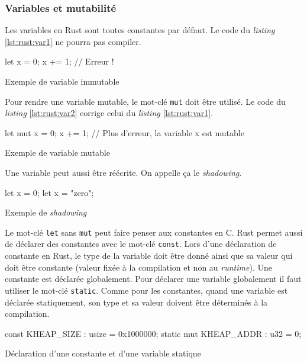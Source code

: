 \subsubsection{Variables et mutabilité}
Les variables en Rust sont toutes constantes par défaut. Le code du \textit{listing}
\ref{lst:rust:var1} ne pourra pas compiler.

\begin{code}
\begin{rustcode}
let x = 0;
x += 1; // Erreur !
\end{rustcode}
\caption{Exemple de variable immutable}
\label{lst:rust:var1}
\end{code} \bigbreak

Pour rendre une variable mutable, le mot-clé \texttt{mut} doit être utilisé.
Le code du \textit{listing} \ref{lst:rust:var2} corrige celui du \textit{listing}
\ref{lst:rust:var1}.

\begin{code}
\begin{rustcode}
let mut x = 0;
x += 1; // Plus d'erreur, la variable x est mutable
\end{rustcode}
\caption{Exemple de variable mutable}
\label{lst:rust:var2}
\end{code} \bigbreak

Une variable peut aussi être réécrite. On appelle ça le \textit{shadowing}.

\begin{code}
\begin{rustcode}
let x = 0;
let x = "zero";
\end{rustcode}
\caption{Exemple de \textit{shadowing}}
\label{lst:rust:var3}
\end{code} \bigbreak

Le mot-clé \texttt{let} sans \texttt{mut} peut faire penser
aux constantes en C. Rust permet aussi de déclarer des constantes avec le mot-clé
\texttt{const}. Lors d'une déclaration de constante en Rust, le type
de la variable doit être donné ainsi que sa valeur qui doit être constante (valeur
fixée à la compilation et non au \textit{runtime}). Une constante est déclarée
globalement. Pour déclarer une variable globalement il faut utiliser le mot-clé
\texttt{static}. Comme pour les constantes, quand une variable est déclarée
statiquement, son type et sa valeur doivent être déterminés à la compilation.

\begin{code}
\begin{rustcode}
const KHEAP_SIZE        : usize = 0x1000000;
static mut KHEAP_ADDR   : u32   = 0;
\end{rustcode}
\caption{Déclaration d'une constante et d'une variable statique}
\label{lst:rust:var4}
\end{code} \bigbreak

